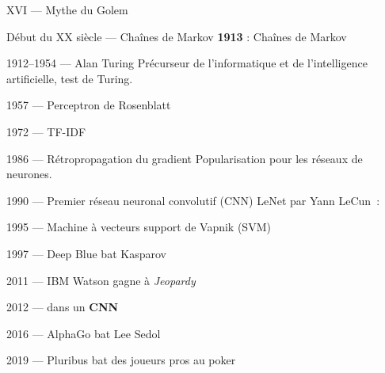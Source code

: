 \begin{frame}{XVI\ieme{} --- Mythe du Golem}
\end{frame}

\begin{frame}{Début du XX\ieme{} siècle --- Chaînes de Markov}
  \textbf{1913} : Chaînes de Markov
\end{frame}

\begin{frame}{1912--1954 --- Alan Turing}
  Précurseur de l'informatique et de l'intelligence artificielle, test de Turing.

\end{frame}

\begin{frame}{1957 --- Perceptron de Rosenblatt}
\end{frame}

\begin{frame}{1972 --- TF-IDF}
\end{frame}

\begin{frame}{1986 --- Rétropropagation du gradient}
  Popularisation pour les réseaux de neurones.

\end{frame}

\begin{frame}{1990 --- Premier réseau neuronal convolutif (CNN)}
  LeNet par Yann LeCun~:
\end{frame}

\begin{frame}{1995 --- Machine à vecteurs support de Vapnik (SVM)}
\end{frame}

\begin{frame}{1997 --- Deep Blue bat Kasparov}
\end{frame}

\begin{frame}{2011 --- IBM Watson gagne à \textit{Jeopardy}}
\end{frame}

\begin{frame}{2012 ---  dans un \textbf{CNN}}
\end{frame}

\begin{frame}{2016 --- AlphaGo bat Lee Sedol}
\end{frame}

\begin{frame}{2019 --- Pluribus bat des joueurs pros au poker}
\end{frame}

